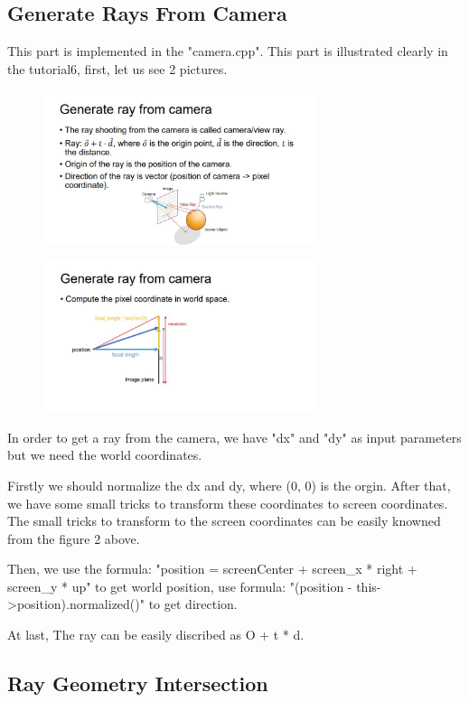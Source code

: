 \documentclass[acmtog]{acmart}
\begin{document}
\subsection{Generate Rays From Camera}
\quad This part is implemented in the "camera.cpp". 
This part is illustrated clearly in the tutorial6, first, let us see 2 pictures. 
\begin{figure}[h]
	\centering
	{\includegraphics[width=8cm]{c1.JPG}}	
\end{figure}

\begin{figure}[h]
	\centering
	{\includegraphics[width=8cm]{c2.JPG}}	
\end{figure}
In order to get a ray from the camera, we have "dx" and "dy" as input parameters but we need the world coordinates.

Firstly we should normalize the dx and dy, where (0, 0) is the orgin. After that, we have some small tricks to transform these coordinates to screen coordinates. 
The small tricks to transform to the screen coordinates can be easily knowned from the figure 2 above.

Then, we use the formula: "position = screenCenter + screen\_x * right + screen\_y * up" to get world position, use formula: "(position - this->position).normalized()" to get direction.


At last, The ray can be easily discribed as O + t * d.


\subsection{Ray Geometry Intersection}
\end{document}
